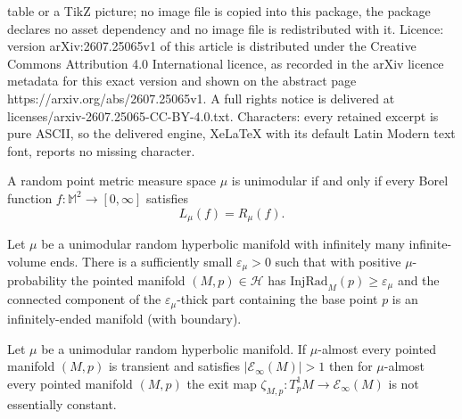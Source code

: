 \documentclass[10pt,a4paper]{amsart}
\newcommand{\EndsInf}[1]{\mathcal{E}_{\infty}\left(#1\right)}
\newcommand{\Hypers}{\mathcal{H}}
\newcommand{\MM}{\mathbb{M}}
\begin{document}
table or a TikZ picture; no image file is copied into this package, the package declares no asset dependency and no image file is redistributed with it. Licence: version arXiv:2607.25065v1 of this article is distributed under the Creative Commons Attribution 4.0 International licence, as recorded in the arXiv licence metadata for this exact version and shown on the abstract page https://arxiv.org/abs/2607.25065v1. A full rights notice is delivered at licenses/arxiv-2607.25065-CC-BY-4.0.txt. Characters: every retained excerpt is pure ASCII, so the delivered engine, XeLaTeX with its default Latin Modern text font, reports no missing character.
\begin{lemma}
\label{lemma:MTP}
A random point metric measure space $\mu$ is unimodular if and only if every Borel function $f : \MM^2 \to \left[0,\infty\right]$ satisfies
\begin{equation}
L_\mu(f) = R_\mu(f).
\end{equation}
\end{lemma}

\begin{cor}
\label{cor:thick part is infinitely ended}
Let $\mu$ be a unimodular random hyperbolic manifold with infinitely many infinite-volume ends. There is a sufficiently small  $\varepsilon_\mu > 0$ such that with positive  $\mu$-probability the pointed manifold $(M,p) \in \Hypers$ has $\mathrm{InjRad}_M(p) \ge \varepsilon_\mu$ and  the connected component of the $\varepsilon_\mu$-thick part containing the base point $p$ is an infinitely-ended manifold (with boundary).
\end{cor}

\begin{theorem}
\label{thm:random walk does not converge to a single end}
Let $\mu$ be a unimodular random hyperbolic manifold.  If $\mu$-almost every pointed manifold $(M,p)$ is transient and  satisfies $|\EndsInf{M}| > 1$ then for $\mu$-almost every pointed manifold $(M,p)$ the exit map $\zeta_{M,p} : T^1_p M \to \EndsInf{M}$  is not essentially constant.
\end{theorem}
\end{document}
